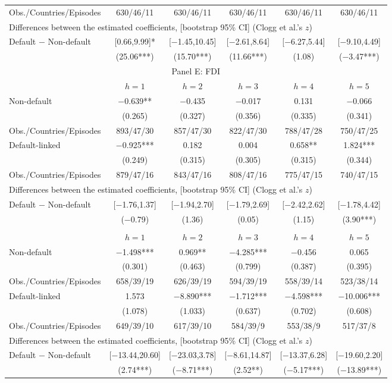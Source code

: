 \documentclass[12pt]{article}
\begin{document}
\begin{longtable}{lccccc}
Obs./Countries/Episodes & 630/46/11 & 630/46/11 & 630/46/11 & 630/46/11 & 630/46/11 \\[4pt]
\multicolumn{6}{l}{Differences between the estimated coefficients, [bootstrap 95\% CI] (Clogg et al.'s $z$)} \\[2pt]
Default $-$ Non-default & [0.66,9.99]* & [$-$1.45,10.45] & [$-$2.61,8.64] & [$-$6.27,5.44] & [$-$9.10,4.49] \\
 & (25.06***) & (15.70***) & (11.66***) & (1.08) & ($-$3.47***) \\[5pt]
\multicolumn{6}{c}{\large Panel E: FDI} \\
\toprule
 & $h=1$ & $h=2$ & $h=3$ & $h=4$ & $h=5$ \\
\midrule
Non-default & $-$0.639** & $-$0.435 & $-$0.017 & 0.131 & $-$0.066 \\
 & (0.265) & (0.327) & (0.356) & (0.335) & (0.341) \\[1pt]
Obs./Countries/Episodes & 893/47/30 & 857/47/30 & 822/47/30 & 788/47/28 & 750/47/25 \\[3pt]
Default-linked & $-$0.925*** & 0.182 & 0.004 & 0.658** & 1.824*** \\
 & (0.249) & (0.315) & (0.305) & (0.315) & (0.344) \\[1pt]
Obs./Countries/Episodes & 879/47/16 & 843/47/16 & 808/47/16 & 775/47/15 & 740/47/15 \\[4pt]
\multicolumn{6}{l}{Differences between the estimated coefficients, [bootstrap 95\% CI] (Clogg et al.'s $z$)} \\[2pt]
Default $-$ Non-default & [$-$1.76,1.37] & [$-$1.94,2.70] & [$-$1.79,2.69] & [$-$2.42,2.62] & [$-$1.78,4.42] \\
 & ($-$0.79) & (1.36) & (0.05) & (1.15) & (3.90***) \\
\newpage
\multicolumn{6}{c}{\large Panel F: Real lending rate} \\
\toprule
 & $h=1$ & $h=2$ & $h=3$ & $h=4$ & $h=5$ \\
\midrule
Non-default & $-$1.498*** & 0.969** & $-$4.285*** & $-$0.456 & 0.065 \\
 & (0.301) & (0.463) & (0.799) & (0.387) & (0.395) \\[1pt]
Obs./Countries/Episodes & 658/39/19 & 626/39/19 & 594/39/19 & 558/39/14 & 523/38/14 \\[3pt]
Default-linked & 1.573 & $-$8.890*** & $-$1.712*** & $-$4.598*** & $-$10.006*** \\
 & (1.078) & (1.033) & (0.637) & (0.702) & (0.608) \\[1pt]
Obs./Countries/Episodes & 649/39/10 & 617/39/10 & 584/39/9 & 553/38/9 & 517/37/8 \\[4pt]
\multicolumn{6}{l}{Differences between the estimated coefficients, [bootstrap 95\% CI] (Clogg et al.'s $z$)} \\[2pt]
Default $-$ Non-default & [$-$13.44,20.60] & [$-$23.03,3.78] & [$-$8.61,14.87] & [$-$13.37,6.28] & [$-$19.60,2.20] \\
 & (2.74***) & ($-$8.71***) & (2.52**) & ($-$5.17***) & ($-$13.89***) \\
\end{longtable}
\end{document}
